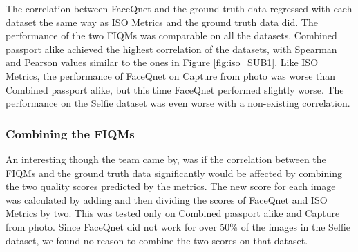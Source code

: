 \noindent
The correlation between FaceQnet and the ground truth data regressed with each dataset the same way as ISO Metrics and the ground truth data did. The performance of the two FIQMs was comparable on all the datasets. Combined passport alike achieved the highest correlation of the datasets, with Spearman and Pearson values similar to the ones in Figure \ref{fig:iso_SUB1}. Like ISO Metrics, the performance of FaceQnet on Capture from photo was worse than Combined passport alike, but this time FaceQnet performed slightly worse. The performance on the Selfie dataset was even worse with a non-existing correlation. 

\subsubsection{Combining the FIQMs}
An interesting though the team came by, was if the correlation between the FIQMs and the ground truth data significantly would be affected by combining the two quality scores predicted by the metrics. The new score for each image was calculated by adding and then dividing the scores of FaceQnet and ISO Metrics by two. This was tested only on Combined passport alike and Capture from photo. Since FaceQnet did not work for over 50\% of the images in the Selfie dataset, we found no reason to combine the two scores on that dataset. 

